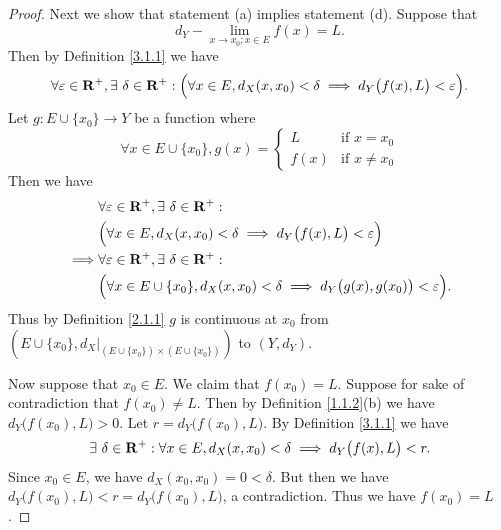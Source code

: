 \begin{proof}
    Next we show that statement (a) implies statement (d).
    Suppose that
    \[
        d_Y - \lim_{x \to x_0 ; x \in E} f(x) = L.
    \]
    Then by Definition \ref{3.1.1} we have
    \[
        \forall \varepsilon \in \mathbf{R}^+, \exists\ \delta \in \mathbf{R}^+ : \Big(\forall x \in E, d_X(x, x_0) < \delta \implies d_Y\big(f(x), L\big) < \varepsilon\Big).
    \]
    Let \(g : E \cup \{x_0\} \to Y\) be a function where
    \[
        \forall x \in E \cup \{x_0\}, g(x) = \begin{cases}
            L    & \text{if } x = x_0    \\
            f(x) & \text{if } x \neq x_0
        \end{cases}
    \]
    Then we have
    \begin{align*}
                 & \forall \varepsilon \in \mathbf{R}^+, \exists\ \delta \in \mathbf{R}^+ :                                                       \\
                 & \Big(\forall x \in E, d_X(x, x_0) < \delta \implies d_Y\big(f(x), L\big) < \varepsilon\Big)                    \\
        \implies & \forall \varepsilon \in \mathbf{R}^+, \exists\ \delta \in \mathbf{R}^+ :                                                       \\
                 & \Big(\forall x \in E \cup \{x_0\}, d_X(x, x_0) < \delta \implies d_Y\big(g(x), g(x_0)\big) < \varepsilon\Big).
    \end{align*}
    Thus by Definition \ref{2.1.1} \(g\) is continuous at \(x_0\) from \((E \cup \{x_0\}, d_X|_{(E \cup \{x_0\}) \times (E \cup \{x_0\})})\) to \((Y, d_Y)\).

    Now suppose that \(x_0 \in E\).
    We claim that \(f(x_0) = L\).
    Suppose for sake of contradiction that \(f(x_0) \neq L\).
    Then by Definition \ref{1.1.2}(b) we have \(d_Y\big(f(x_0), L\big) > 0\).
    Let \(r = d_Y\big(f(x_0), L\big)\).
    By Definition \ref{3.1.1} we have
    \[
        \exists\ \delta \in \mathbf{R}^+ : \forall x \in E, d_X(x, x_0) < \delta \implies d_Y\big(f(x), L\big) < r.
    \]
    Since \(x_0 \in E\), we have \(d_X(x_0, x_0) = 0 < \delta\).
    But then we have \(d_Y\big(f(x_0), L\big) < r = d_Y\big(f(x_0), L\big)\), a contradiction.
    Thus we have \(f(x_0) = L\).


\end{proof}
